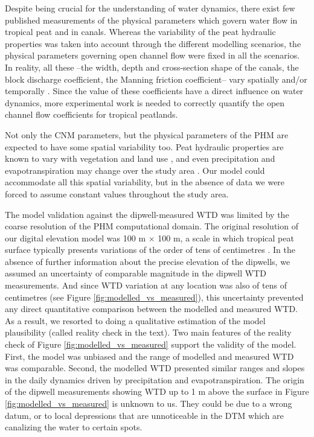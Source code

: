 \documentclass[bg, manuscript]{copernicus}
\begin{document}
Despite being crucial for the understanding of water dynamics, there exist few published measurements of the physical parameters which govern water flow in tropical peat and in canals.
Whereas the variability of the peat hydraulic properties was taken into account through the different modelling scenarios, the physical parameters governing open channel flow were fixed in all the scenarios. 
In reality, all these --the width, depth and cross-section shape of the canals, the block discharge coefficient, the Manning friction coefficient-- vary spatially and/or temporally  \citep{ritzemaCanalBlockingStrategies2014, osakiTropicalPeatlandEcosystems2016}.
Since the value of these coefficients have a direct influence on water dynamics, more experimental work is needed to correctly quantify the open channel flow coefficients for tropical peatlands.

Not only the CNM parameters, but the physical parameters of the PHM are expected to have some spatial variability too.
Peat hydraulic properties are known to vary with vegetation and land use  \citep{bairdHighPermeabilityExplains2017, kurniantoInfluenceLandcoverChanges2019}, and even precipitation and evapotranspiration may change over the study area \citep{vijithSpatialTemporalCharacteristics2020}.
Our model could accommodate all this spatial variability, but in the absence of data we were forced to assume constant values throughout the study area.

The model validation against the dipwell-measured WTD was limited by the coarse resolution of the PHM computational domain.
The original resolution of our digital elevation model was 100 \unit{m} $\times$ 100 \unit{m}, a scale in which tropical peat surface typically presents variations of the order of tens of centimetres \citep{lampelaGroundSurfaceMicrotopography2016}.
In the absence of further information about the precise  elevation of the dipwells, we assumed an uncertainty of comparable magnitude in the dipwell WTD measurements.
And since WTD  variation at any location was also of  tens of centimetres (see Figure \ref{fig:modelled_vs_measured}), this uncertainty prevented any direct quantitative comparison between the modelled and measured WTD.
As a result, we  resorted to doing a qualitative estimation of the model plausibility (called reality check in the text).
Two main features of the reality check of Figure \ref{fig:modelled_vs_measured} support the validity of the model.
First, the model was unbiased and the range of modelled and measured WTD was comparable.
Second,  the modelled WTD presented similar ranges and slopes in the daily dynamics driven by precipitation and evapotranspiration.
The origin of the dipwell measurements showing WTD up to 1 m above the surface in Figure \ref{fig:modelled_vs_measured} is unknown to us.
They could be due to a wrong datum, or to local depressions that are unnoticeable in the DTM which are canalizing the water to certain spots.
\end{document}
